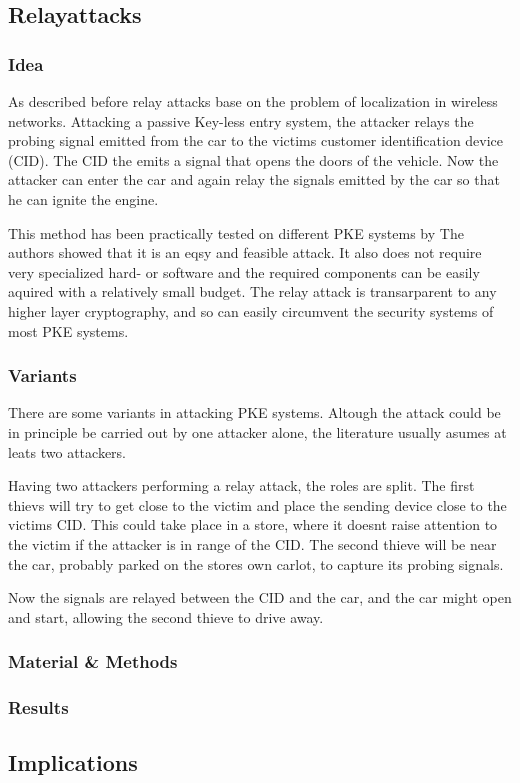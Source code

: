 
\subsection{Relayattacks}
\subsubsection*{Idea}
	As described before relay attacks base on the problem of localization in
	wireless networks.
	Attacking a passive Key-less entry system,
	the attacker relays the probing signal emitted from the car to the victims
	customer identification device (CID).
	The CID the emits a signal that opens the doors of the vehicle.
	Now the attacker can enter the car and again relay the signals emitted by the
	car so that he can ignite the engine.
	
	This method has been practically tested on different PKE systems by %
	The authors showed that it is an eqsy and feasible attack.
	It also does not require very specialized hard- or software and
	the required components can be easily aquired with a relatively small budget.
	The relay attack is transarparent to any higher layer cryptography,	%
	and so can easily circumvent the security systems of most PKE systems.

\subsubsection*{Variants}
	There are some variants in attacking PKE systems.
	Altough the attack could be in principle be carried out by one attacker alone,
	the literature usually asumes at leats two attackers.

	Having two attackers performing a relay attack,
	the roles are split.
	The first thievs will try to get close to the victim and place
	the sending device close to the victims CID.
	This could take place in a store,
	where it doesnt raise attention to the victim if the attacker
	is in range of the CID.
	The second thieve will be near the car,
	probably parked on the stores own carlot,
	to capture its probing signals.

	Now the signals are relayed between the CID and the car,
	and the car might open and start,
	allowing the second thieve to drive away.

\subsubsection*{Material \& Methods}

\subsubsection*{Results}

\subsection*{Implications}
